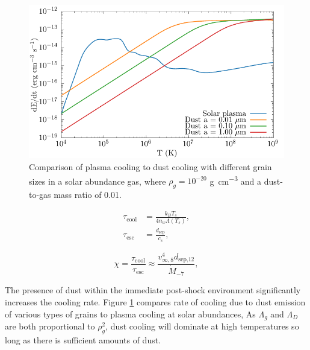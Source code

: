 \begin{figure}
  \centering
  \includegraphics{assets/dust-plasma-cooling-comparison/cooling-comparison.pdf}
  \caption[Dust cooling vs. plasma cooling]{Comparison of plasma cooling to dust cooling with different grain sizes in a solar abundance gas, where $\rho_g = 10^{-20}$ \si{\gram\per\centi\metre\cubed} and a dust-to-gas mass ratio of 0.01.}
  \label{fig:dustplasmacomparison}
\end{figure}



\begin{subequations}
  \begin{align}
    \tau_\text{cool} & = \frac{k_B T_s}{4n_w \Lambda(T_s)} \label{eq:taucool} ,\\ 
    \tau_\text{esc}  & = \frac{d_\text{sep}}{c_s} \label{eq:tauesc} ,
  \end{align}
\end{subequations}

\begin{equation}
  \chi = \frac{\tau_\text{cool}}{\tau_\text{esc}} \approx \frac{v^4_{\infty,8} d_\text{sep,12}}{\dot M_{-7}} \label{eq:coolingparameter} ,
\end{equation}

The presence of dust within the immediate post-shock environment significantly increases the cooling rate.
Figure \ref{fig:dustplasmacomparison} compares rate of cooling due to dust emission of various types of grains to plasma cooling at solar abundances, 
As $\Lambda_g$ and $\Lambda_D$ are both proportional to $\rho_g^2$, dust cooling will dominate at high temperatures so long as there is sufficient amounts of dust.

